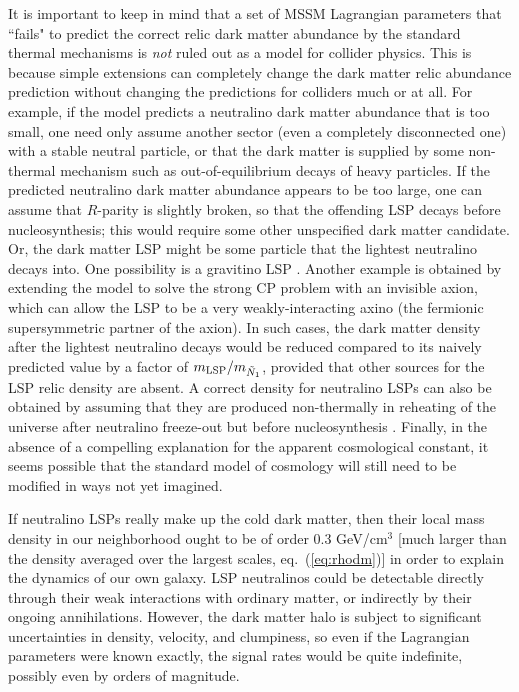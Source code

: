 \documentclass[12pt]{article}
\begin{document}
It is important to keep in mind that a set of MSSM Lagrangian 
parameters that ``fails" to predict the correct relic dark matter abundance 
by the standard thermal mechanisms is {\em not} ruled out as a model for 
collider physics. This is because simple extensions can completely change 
the dark matter relic abundance prediction without changing the predictions for 
colliders much or at all. For example, if the model predicts a neutralino 
dark matter abundance that is too small, one need only assume another 
sector (even a completely disconnected one) with a stable neutral 
particle, or that the dark matter is supplied by some non-thermal 
mechanism such as out-of-equilibrium decays of heavy particles. If the 
predicted neutralino dark matter abundance appears to be too large, one 
can assume that $R$-parity is slightly broken, so that the offending LSP 
decays before nucleosynthesis; this would require some other unspecified 
dark matter candidate. Or, the dark matter LSP might be some particle that 
the lightest neutralino decays into. One possibility is a gravitino LSP 
\cite{gravitinoDMfromdecays}.  Another example is obtained by extending 
the model to solve the strong CP problem with an invisible axion, which 
can allow the LSP to be a very weakly-interacting axino \cite{axinoDM} 
(the fermionic supersymmetric partner of the axion). In such cases, the 
dark matter density after the lightest neutralino decays would be reduced 
compared to its naively predicted value by a factor of $m_{\rm 
LSP}/m_{\tilde N_1}$, provided that other sources for the LSP relic 
density are absent. A correct density for neutralino LSPs can also be 
obtained by assuming that they are produced non-thermally in reheating of 
the universe after neutralino freeze-out but before nucleosynthesis 
\cite{gelgon}. Finally, in the absence of a compelling explanation for the 
apparent cosmological constant, it seems possible that the standard model 
of cosmology will still need to be modified in ways not yet imagined.

If neutralino LSPs really make up the cold dark matter, then their local 
mass density in our neighborhood ought to be of order 0.3 GeV/cm$^3$ [much 
larger than the density averaged over the largest scales, 
eq.~(\ref{eq:rhodm})] in order to explain the dynamics of our own galaxy. 
LSP neutralinos could be detectable directly through their weak 
interactions with ordinary matter, or indirectly by their ongoing 
annihilations. However, the dark matter halo is subject to significant uncertainties 
in density, velocity, and clumpiness, so even if the Lagrangian 
parameters were known exactly, the signal rates would be quite indefinite, 
possibly even by orders of magnitude.
\end{document}
